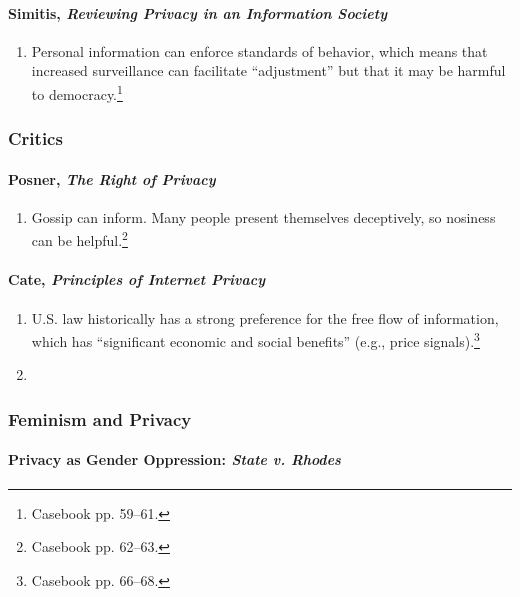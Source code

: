 \paragraph{Simitis, \emph{Reviewing Privacy in an Information Society}}

\begin{enumerate}
    \item Personal information can enforce standards of behavior, which means 
    that increased surveillance can facilitate ``adjustment'' but that it may 
    be harmful to democracy.\footnote{Casebook pp. 59--61.}
\end{enumerate}

\subsubsection{Critics}

\paragraph{Posner, \emph{The Right of Privacy}}

\begin{enumerate}
    \item Gossip can inform. Many people present themselves deceptively, so 
    nosiness can be helpful.\footnote{Casebook pp. 62--63.}
\end{enumerate}

\paragraph{Cate, \emph{Principles of Internet Privacy}}

\begin{enumerate}
    \item U.S. law historically has a strong preference for the free flow of 
    information, which has ``significant economic and social benefits'' (e.g., 
    price signals).\footnote{Casebook pp. 66--68.}
    \item 
\end{enumerate}

\subsubsection{Feminism and Privacy}

\paragraph{Privacy as Gender Oppression: \emph{State v. Rhodes}}

